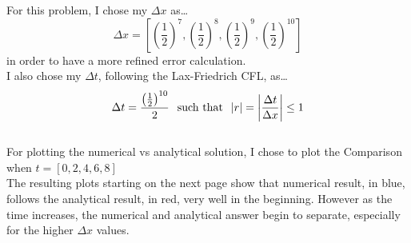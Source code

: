 \documentclass[12pt,letterpaper]{article}
\begin{document}
For this problem, I chose my $\Delta x$ as\ldots
\begin{equation*}
    \Delta x = \left[ \left(\frac{1}{2}\right)^{7}, \left(\frac{1}{2}\right)^{8}, \left(\frac{1}{2}\right)^{9}, \left(\frac{1}{2}\right)^{10} \right] 
\end{equation*}
in order to have a more refined error calculation.
\\

I also chose my $\Delta t$, following the Lax-Friedrich CFL, as\ldots
\begin{equation*}
    \Delta t = \frac{\left(\frac{1}{2}\right)^{10}}{2}  \text{\hspace{0.25cm}such that\hspace{0.25cm}} |r| = \left\lvert \frac{\Delta t}{\Delta x}\right\rvert   \leq  1
\end{equation*}
\\

For plotting the numerical vs analytical solution, I chose to plot the Comparison when $t = \left[0,2,4,6,8\right]$
\\

The resulting plots starting on the next page show that numerical result, in blue, follows the analytical result, in red, very well in the beginning. However as the time increases, the numerical and analytical answer begin to separate, especially for the higher $\Delta x$ values.


\newpage
\end{document}
